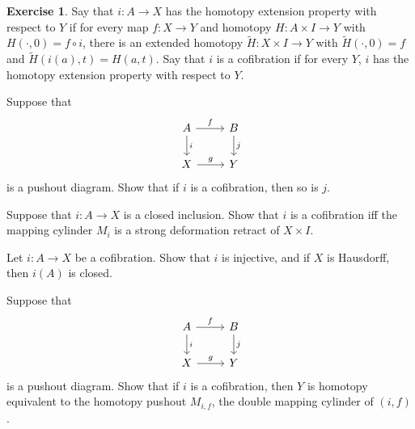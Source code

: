\documentclass[10pt]{article}
\theoremstyle{definition}
\newtheorem{exer}{Exercise}
\begin{document}
\begin{exer}
Say that $i: A \to X$ has the homotopy extension property with respect to $Y$ if for every map $f: X \to Y$ and homotopy $H: A \times I \to Y$ with $H(\cdot, 0) = f \circ i$, there is an extended homotopy $\tilde H: X \times I \to Y$ with $\tilde H(\cdot, 0) = f$ and $\tilde H(i(a), t) = H(a, t)$.
Say that $i$ is a cofibration if for every $Y$, $i$ has the homotopy extension property with respect to $Y$.

Suppose that
$$\begin{tikzcd}
A \arrow[r,"f"] \arrow[d,"i"] & B \arrow[d,"j"]\\
X \arrow[r,"g"] & Y
\end{tikzcd}$$
is a pushout diagram. Show that if $i$ is a cofibration, then so is $j$.

Suppose that $i: A \to X$ is a closed inclusion. Show that $i$ is a cofibration iff the mapping cylinder $M_i$ is a strong deformation retract of $X \times I$.

Let $i: A \to X$ be a cofibration. Show that $i$ is injective, and if $X$ is Hausdorff, then $i(A)$ is closed.

Suppose that
$$\begin{tikzcd}
A \arrow[r,"f"] \arrow[d,"i"] & B \arrow[d,"j"]\\
X \arrow[r,"g"] & Y
\end{tikzcd}$$
is a pushout diagram. Show that if $i$ is a cofibration, then $Y$ is homotopy equivalent to the homotopy pushout $M_{i,f}$, the double mapping cylinder of $(i, f)$.
\end{exer}
\end{document}
